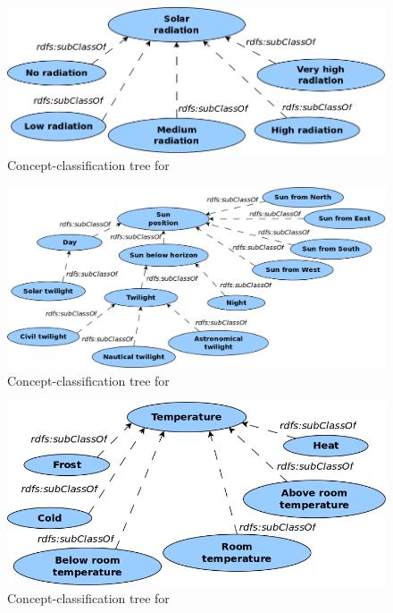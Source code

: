 \begin{figure}
  \centering
  \includegraphics[width=.8\textwidth]{figures/diagrams/solar-radiation.png}
  \caption{Concept-classification tree for }
  \label{fig:tree_solar_radiation}
\end{figure}

\begin{figure}
  \centering
  \includegraphics[width=\textwidth]{figures/diagrams/sun-position.png}
  \caption{Concept-classification tree for }
  \label{fig:tree_sun_position}
\end{figure}

\begin{figure}
  \centering
  \includegraphics[width=.8\textwidth]{figures/diagrams/temperature.png}
  \caption{Concept-classification tree for }
  \label{fig:tree_temperature}
\end{figure}

